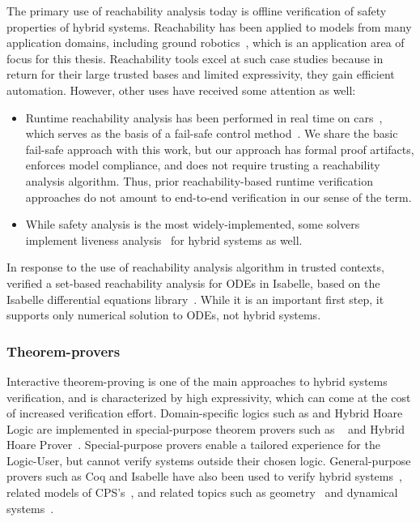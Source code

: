 \documentclass[12pt]{cmuthesis}
\theoremstyle{definition}
\theoremstyle{remark}
\begin{document}
The primary use of reachability analysis today is offline verification of safety properties of hybrid systems.
Reachability has been applied to models from many application domains, including ground robotics~\cite{chen2015benchmark}, which is an application area of focus for this thesis.
Reachability tools excel at such case studies because in return for their large trusted bases and limited expressivity, they gain efficient automation.
However, other uses have received some attention as well:
\begin{itemize}
\item
Runtime reachability analysis has been performed in real time on cars~\cite{DBLP:journals/trob/AlthoffD14}, which serves as the basis of a fail-safe control method~\cite{DBLP:conf/icra/PereiraA15}.
We share the basic fail-safe approach with this work, but our approach has formal proof artifacts, enforces model compliance, and does not require trusting a reachability analysis algorithm.
Thus, prior reachability-based runtime verification approaches do not amount to end-to-end verification in our sense of the term.
\item While safety analysis is the most widely-implemented, some solvers~\cite{DBLP:conf/tacas/CimattiGMT15} implement liveness analysis~\cite{DBLP:conf/cav/CimattiGMT14} for hybrid systems as well.
\end{itemize}
In response to the use of reachability analysis algorithm in trusted contexts, \cite{DBLP:conf/tacas/Immler15} verified a set-based reachability analysis for ODEs in Isabelle, based on the Isabelle differential equations library~\cite{DBLP:conf/itp/ImmlerT16}.
While it is an important first step, it supports only numerical solution to ODEs, not hybrid systems.


\subsubsection{Theorem-provers}
Interactive theorem-proving is one of the main approaches to hybrid systems verification, and is characterized by high expressivity, which can come at the cost of increased verification effort.
Domain-specific logics such as \dL and Hybrid Hoare Logic are implemented in special-purpose theorem provers such as \KeYmaeraX~\cite{DBLP:conf/cade/FultonMQVP15} and Hybrid Hoare Prover~\cite{DBLP:conf/aplas/LiuLQZZZZ10}.
Special-purpose provers enable a tailored experience for the Logic-User, but cannot verify systems outside their chosen logic.
General-purpose provers such as Coq and Isabelle have also been used to verify hybrid systems~\cite{DBLP:conf/cpp/Rouhling18}, related models of CPS's~\cite{DBLP:conf/atva/RizaldiISA18,DBLP:conf/ifm/RizaldiKHFIAHN17,chan2016formal}, and related topics such as geometry~\cite{DBLP:conf/cpp/AffeldtC17} and dynamical systems~\cite{DBLP:conf/itp/CohenR17}.
\end{document}
